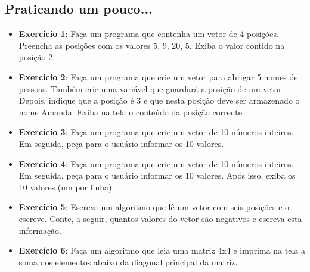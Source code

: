 \documentclass{article}
\begin{document}
\subsection{Praticando um pouco...}
\begin{itemize}
    \item \textbf{Exercício 1}: Faça um programa que contenha um vetor de 4 posições. Preencha as posições com os valores 5, 9, 20, 5. Exiba o valor contido na posição 2.
    \item \textbf{Exercício 2}: Faça um programa que crie um vetor para abrigar 5 nomes de pessoas. Também crie uma variável que guardará a posição de um vetor. Depois, indique que a posição é 3 e que nesta posição deve ser armazenado o nome Amanda. Exiba na tela o conteúdo da posição corrente.
    \item \textbf{Exercício 3}: Faça um programa que crie um vetor de 10 números inteiros. Em seguida, peça para o usuário informar os 10 valores.
    \item \textbf{Exercício 4}: Faça um programa que crie um vetor de 10 números inteiros. Em seguida, peça para o usuário informar os 10 valores. Após isso, exiba os 10 valores (um por linha)
    \item \textbf{Exercício 5}: Escreva um algoritmo que lê um vetor com seis posições e o escreve. Conte, a seguir, quantos valores do vetor são negativos e escreva esta informação.
    \item \textbf{Exercício 6}: Faça um algoritmo que leia uma matriz 4x4 e imprima na tela a soma dos elementos abaixo da diagonal principal da matriz.
\end{itemize}
\end{document}
